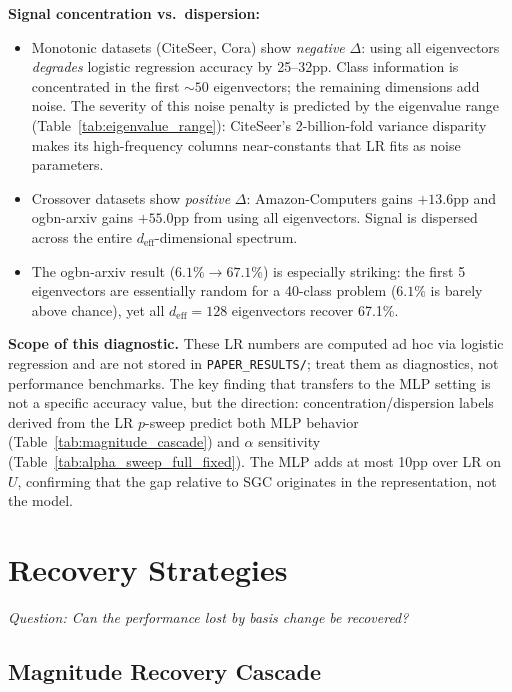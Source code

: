 \documentclass[11pt]{article}
\begin{document}
\noindent\textbf{Signal concentration vs.\ dispersion:}
\begin{itemize}
  \item Monotonic datasets (CiteSeer, Cora) show \emph{negative} $\Delta$: using all
    eigenvectors \emph{degrades} logistic regression accuracy by 25--32pp. Class information
    is concentrated in the first ${\sim}50$ eigenvectors; the remaining dimensions add noise.
    The severity of this noise penalty is predicted by the eigenvalue range
    (Table~\ref{tab:eigenvalue_range}): CiteSeer's 2-billion-fold variance disparity
    makes its high-frequency columns near-constants that LR fits as noise parameters.
  \item Crossover datasets show \emph{positive} $\Delta$: Amazon-Computers gains $+13.6$pp
    and ogbn-arxiv gains $+55.0$pp from using all eigenvectors.  Signal is dispersed across
    the entire $d_{\text{eff}}$-dimensional spectrum.
  \item The ogbn-arxiv result ($6.1\% \to 67.1\%$) is especially striking: the first 5
    eigenvectors are essentially random for a 40-class problem ($6.1\%$ is barely above
    chance), yet all $d_{\text{eff}}{=}128$ eigenvectors recover 67.1\%.
\end{itemize}

\noindent\textbf{Scope of this diagnostic.}
These LR numbers are computed ad hoc via logistic regression and are not stored in
\texttt{PAPER\_RESULTS/}; treat them as diagnostics, not performance benchmarks.
The key finding that transfers to the MLP setting is not a specific accuracy value,
but the direction: concentration/dispersion labels derived from the LR $p$-sweep
predict both MLP behavior (Table~\ref{tab:magnitude_cascade}) and $\alpha$ sensitivity
(Table~\ref{tab:alpha_sweep_full_fixed}).  The MLP adds at most 10pp over LR on $U$,
confirming that the gap relative to SGC originates in the representation, not the model.

\section{Recovery Strategies}
\textit{Question: Can the performance lost by basis change be recovered?}
\label{sec:recovery}

\subsection{Magnitude Recovery Cascade}
\end{document}
